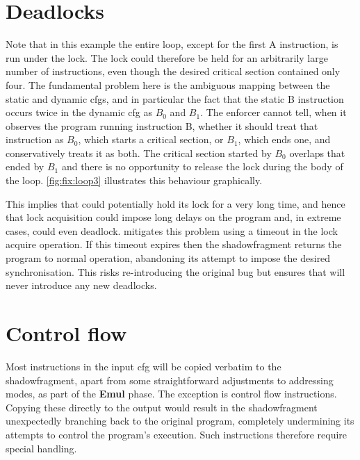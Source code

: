 \section{Deadlocks}
\label{sect:fix:deadlocks}
Note that in this example the entire loop, except for the first A
instruction, is run under the lock.  The lock could therefore be held
for an arbitrarily large number of instructions, even though the
desired critical section contained only four.  The fundamental problem
here is the ambiguous mapping between the static and dynamic
\glspl{cfg}, and in particular the fact that the static B instruction
occurs twice in the \gls{dynamic cfg} as $B_0$ and $B_1$.  The
enforcer cannot tell, when it observes the program running instruction
B, whether it should treat that instruction as $B_0$, which starts a
critical section, or $B_1$, which ends one, and conservatively treats
it as both.  The critical section started by $B_0$ overlaps that ended
by $B_1$ and there is no opportunity to release the lock during the
body of the loop.  \autoref{fig:fix:loop3} illustrates this behaviour
graphically.

This implies that {\technique} could potentially hold its lock for a
very long time, and hence that lock acquisition could impose long
delays on the program and, in extreme cases, could even deadlock.
{\Technique} mitigates this problem using a timeout in the lock
acquire operation.  If this timeout expires then the
\gls{shadowfragment} returns the program to normal operation,
abandoning its attempt to impose the desired
synchronisation.\kern-1.25pt  This risks re-introducing the original bug
but ensures that {\technique} will never introduce any new deadlocks.

\section{Control flow}
Most instructions in the input \gls{cfg} will be copied verbatim to
the \gls{shadowfragment}, apart from some straightforward adjustments
to addressing modes, as part of the \textbf{Emul} phase.  The
exception is control flow instructions.  Copying these directly to the
output would result in the \gls{shadowfragment} unexpectedly branching
back to the original program, completely undermining its attempts to
control the program's execution.  Such instructions therefore require
special handling.

